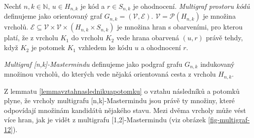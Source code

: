 \begin{definice}
  Nechť $n, k\in \mathbb{N}$, $u\in H_{n,k}$ je kód a $r\in S_{n,k}$ je ohodnocení. \emph{Multigraf prostoru kódů} definujeme jako orientovaný graf $G_{n,k} = (\mathcal{V}, \mathcal{E})$. $\mathcal{V} = \mathcal{P}(H_{n,k})$ je množina vrcholů. $\mathcal{E} \subseteq \mathcal{V} \times \mathcal{V} \times (H_{n,k}\times S_{n,k})$ je množina hran s obarveními, pro kterou platí, že z vrcholu $K_1$ do vrcholu $K_2$ vede hrana obarvená $(u,r)$ právě tehdy, když $K_2$ je potomek $K_1$ vzhledem ke kódu $u$ a ohodnocení $r$. 
\end{definice}


\begin{definice}
  \emph{Multigraf [n,k]-Mastermindu} definujeme jako podgraf grafu $G_{n,k}$ indukovaný množinou vrcholů, do kterých vede nějaká orientovaná cesta z vrcholu $H_{n,k}$. 
  
\end{definice}
Z lemmatu \ref{lemmavztahnaslednikuapotomku} o vztahu následníků a potomků plyne, že vrcholy multigrafu [n,k]-Mastermindu jsou právě ty množiny, které odpovídají množinám kandidátů nějakého stavu. Mezi dvěma vrcholy může vést více hran, jak je vidět z multigrafu [1,2]-Mastermindu (viz obrázek \ref{fig-multigraf-12}).


